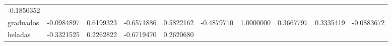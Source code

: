 \documentclass[]{article}
\begin{document}
\begin{longtable}[]{@{}lrrrrrrrrr@{}}
\begin{minipage}[t]{0.09\columnwidth}
-0.1850352\strut
\end{minipage}\tabularnewline
\begin{minipage}[t]{0.09\columnwidth}\raggedright\strut
graduados\strut
\end{minipage} & \begin{minipage}[t]{0.07\columnwidth}\raggedleft\strut
-0.0984897\strut
\end{minipage} & \begin{minipage}[t]{0.07\columnwidth}\raggedleft\strut
0.6199323\strut
\end{minipage} & \begin{minipage}[t]{0.09\columnwidth}\raggedleft\strut
-0.6571886\strut
\end{minipage} & \begin{minipage}[t]{0.07\columnwidth}\raggedleft\strut
0.5822162\strut
\end{minipage} & \begin{minipage}[t]{0.07\columnwidth}\raggedleft\strut
-0.4879710\strut
\end{minipage} & \begin{minipage}[t]{0.07\columnwidth}\raggedleft\strut
1.0000000\strut
\end{minipage} & \begin{minipage}[t]{0.07\columnwidth}\raggedleft\strut
0.3667797\strut
\end{minipage} & \begin{minipage}[t]{0.07\columnwidth}\raggedleft\strut
0.3335419\strut
\end{minipage} & \begin{minipage}[t]{0.09\columnwidth}\raggedleft\strut
-0.0883672\strut
\end{minipage}\tabularnewline
\begin{minipage}[t]{0.09\columnwidth}\raggedright\strut
heladas\strut
\end{minipage} & \begin{minipage}[t]{0.07\columnwidth}\raggedleft\strut
-0.3321525\strut
\end{minipage} & \begin{minipage}[t]{0.07\columnwidth}\raggedleft\strut
0.2262822\strut
\end{minipage} & \begin{minipage}[t]{0.09\columnwidth}\raggedleft\strut
-0.6719470\strut
\end{minipage} & \begin{minipage}[t]{0.07\columnwidth}\raggedleft\strut
0.2620680\strut
\end{minipage} & \begin{minipage}[t]{0.07\columnwidth}\raggedleft\strut

\end{minipage}
\end{longtable}
\end{document}
